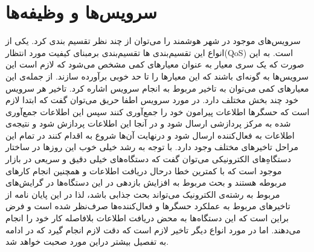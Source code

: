   \section{سرویس‌ها و وظیفه‌ها}
    سرویس‌های موجود در شهر هوشمند را می‌توان از چند نظر تقسیم بندی کرد. یکی از انواع این تقسیم‌بندی ها تقسیم‌بندی برمبنای کیفیت مورد انتظار(QoS) است. به این صورت که یک سری معیار به عنوان معیارهای کمی مشخص می‌شود که لازم است این سرویس‌ها به گونه‌ای باشند که این معیارها را تا حد خوبی برآورده سازند. از جمله‌ی این معیارهای کمی می‌توان به تاخیر مربوط به انجام سرویس اشاره کرد. 
    تاخیر هر سرویس خود چند بخش مختلف دارد. در مورد سرویس اطفا حریق می‌توان گفت که ابتدا لازم است که حسگرها اطلاعات پیرامون خود را جمع‌آوری کنند سپس این اطلاعات جمع‌آوری شده به مرکز پردازشی ارسال شود و در آنجا این اطلاعات پردازش شود و نتیجه‌ی اطلاعات به فعال‌کننده ارسال شود و درنهایت آن‌ها شروع به اقدام کنند در تمام این مراحل تاخیرهای مختلف وجود دارد.
    با توجه به رشد خیلی خوب این روزها در ساختار دستگاهِ‌های الکترونیکی می‌توان گفت که دستگاه‌های خیلی دقیق و سریعی در بازار موجود است که با کمترین خطا درحال دریافت اطلاعات و همچنین انجام کارهای مربوطه هستند و بحث مربوط به افزایش بازدهی در این دستگاه‌ها در گرایش‌های مربوط به رشته‌ی الکترونیک می‌تواند بحث جذابی باشد، لذا در این پایان نامه از تاخیرهای مربوط به عملکرد حسگرها و فعال‌کننده‌ها صرف‌‌نظر شده است و فرض براین است که این دستگاه‌ها به محض دریافت اطلاعات بلافاصله کار خود را انجام می‌دهند. اما در مورد انواع دیگر تاخیر لازم است که دقت لازم انجام گیرد که در ادامه به تفصیل بیشتر دراین مورد صحبت خواهد شد.
    
